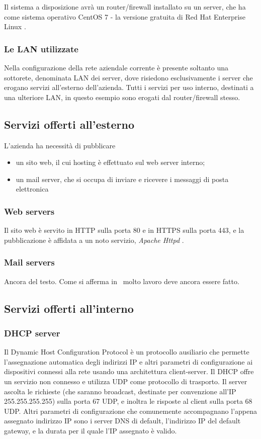 Il sistema a disposizione avrà un router/firewall installato su un server, che ha come sistema operativo CentOS 7 \cite{CENTOS} - la versione gratuita di Red Hat Enterprise Linux \cite{RHEL}.

\subsubsection{Le LAN utilizzate}
Nella configurazione della rete aziendale corrente è presente soltanto una sottorete, denominata LAN dei server, dove risiedono esclusivamente i server che erogano servizi all'esterno dell'azienda. Tutti i servizi per uso interno, destinati a una ulteriore LAN, in questo esempio sono erogati dal router/firewall stesso.

\subsection{Servizi offerti all'esterno}
L'azienda ha necessità di pubblicare
\begin{itemize}
    \item un sito web, il cui hosting è effettuato sul web server interno;
    \item un mail server, che si occupa di inviare e ricevere i messaggi di posta elettronica
\end{itemize}
\subsubsection{Web servers}
Il sito web è servito in HTTP sulla porta 80 e in HTTPS sulla porta 443, e la pubblicazione è affidata a un noto servizio, \emph{Apache Httpd} \cite{APACHE}.
\subsubsection{Mail servers}
Ancora del testo. Come si afferma in~\cite{jones96analysis} molto lavoro deve ancora essere fatto.

\subsection{Servizi offerti all'interno}
\subsubsection{DHCP server}
Il Dynamic Host Configuration Protocol \cite[RFC2131]{RFC2131} è un protocollo ausiliario che permette l'assegnazione automatica degli indirizzi IP e altri parametri di configurazione ai dispositivi connessi alla rete usando una architettura client-server.
Il DHCP offre un servizio non connesso e utilizza UDP come protocollo di trasporto. Il server ascolta le richieste (che saranno broadcast, destinate per convenzione all'IP 255.255.255.255) sulla porta 67 UDP, e inoltra le risposte al client sulla porta 68 UDP.
Altri parametri di configurazione che comunemente accompagnano l'appena assegnato indirizzo IP sono i server DNS \cite[RFC1034]{RFC1034} di default, l'indirizzo IP del default gateway, e la durata per il quale l'IP assegnato è valido.

